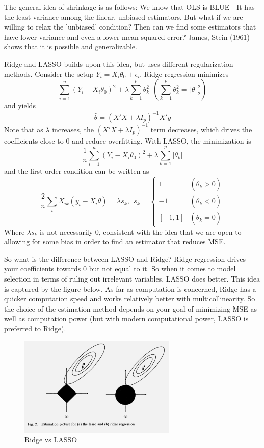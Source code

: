 \documentclass[12pt]{article}
\theoremstyle{definition}
\theoremstyle{property}
\theoremstyle{assumption}
\theoremstyle{example}
\theoremstyle{comment}
\begin{document}
The general idea of shrinkage is as follows: We know that OLS is BLUE - It has the least variance among the linear, unbiased estimators. But what if we are willing to relax the 'unbiased' condition? Then can we find some estimators that have lower variance and even a lower mean squared error? James, Stein (1961) shows that it is possible and generalizable. \par 
Ridge and LASSO builds upon this idea, but uses different regularization methods. Consider the setup $Y_i=X_i\theta_0+\epsilon_i$. Ridge regression minimizes
\[
\sum_{i=1}^n(Y_i-X_i\theta_0)^2+\lambda\sum_{k=1}^p \theta_k^2 \ \ \left(\sum_{k=1}^p \theta_k^2=\Vert \theta\Vert_2^2\right)
\]
and yields
\[
\hat{\theta} = (X'X+\lambda I_p)^{-1}X'y
\]
Note that as $\lambda$ increases, the $(X'X+\lambda I_p)^{-1}$ term decreases, which drives the coefficients close to 0 and reduce overfitting. With LASSO, the minimization is 
\[
\frac{1}{n}\sum_{i=1}^n(Y_i-X_i\theta_0)^2+\lambda\sum_{k=1}^p |\theta_k| 
\]
and the first order condition can be written as
\[
\frac{2}{n}\sum_i X_{ik}(y_i-X_i\theta)=\lambda s_k, \ \ s_k = \begin{cases}1 & (\hat{\theta}_k>0) \\ -1 & (\hat{\theta}_k<0)\\ [-1,1] & (\hat{\theta}_k=0)\end{cases}
\]
Where $\lambda s_k$ is not necessarily 0, consistent with the idea that we are open to allowing for some bias in order to find an estimator that reduces MSE. 
\par So what is the difference between LASSO and Ridge? Ridge regression drives your coefficients towards 0 but not equal to it. So when it comes to model selection in terms of ruling out irrelevant variables, LASSO does better. This idea is captured by the figure below. As far as computation is concerned, Ridge has a quicker computation speed and works relatively better with multicollinearity.  So the choice of the estimation method depends on your goal of minimizing MSE as well as computation power (but with modern computational power, LASSO is preferred to Ridge). 
\begin{figure}[H]
\centering
\includegraphics[width=0.67\textwidth, keepaspectratio]{lasso.png}
\caption{Ridge vs LASSO}
\end{figure}
\end{document}
